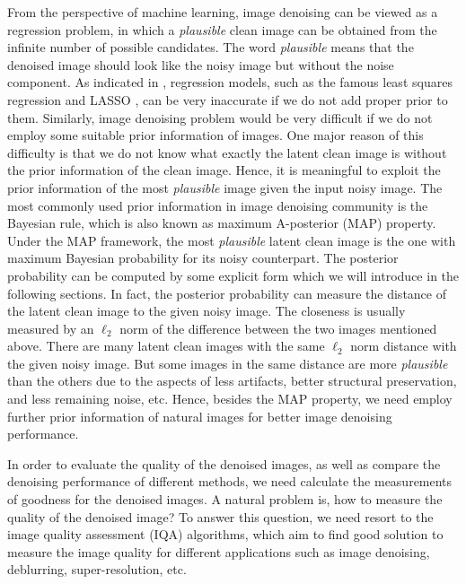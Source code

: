 From the perspective of machine learning, image denoising can be viewed as a regression problem, in which a \textsl{plausible} clean image can be obtained from the infinite number of possible candidates. The word \textsl{plausible} means that the denoised image should look like the noisy image but without the noise component. As indicated in \cite{Bishop}, regression models, such as the famous least squares regression and LASSO \cite{lasso}, can be very inaccurate if we do not add proper prior to them. Similarly, image denoising problem would be very difficult if we do not employ some suitable prior information of images. One major reason of this difficulty is that we do not know what exactly the latent clean image is without the prior information of the clean image. Hence, it is meaningful to exploit the prior information of the most \textsl{plausible} image given the input noisy image. The most commonly used prior information in image denoising community is the Bayesian rule, which is also known as maximum A-posterior (MAP) property. Under the MAP framework, the most \textsl{plausible} latent clean image is the one with maximum Bayesian probability for its noisy counterpart. The posterior probability can be computed by some explicit form which we will introduce in the following sections. In fact, the posterior probability can measure the distance of the latent clean image to the given noisy image. The closeness is usually measured by an $\ell_{2}$ norm of the difference between the two images mentioned above. There are many latent clean images with the same $\ell_{2}$ norm distance with the given noisy image. But some images in the same distance are more \textsl{plausible} than the others due to the aspects of less artifacts, better structural preservation, and less remaining noise, etc. Hence, besides the MAP property, we need employ further prior information of natural images for better image denoising performance.


In order to evaluate the quality of the denoised images, as well as compare the denoising performance of different methods, we need calculate the measurements of goodness for the denoised images. A natural problem is, how to measure the quality of the denoised image? To answer this question, we need resort to the image quality assessment (IQA) algorithms, which aim to find good solution to measure the image quality for different applications such as image denoising, deblurring, super-resolution, etc. 

